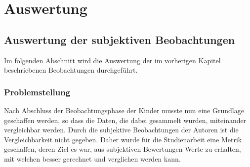 \chapter{Auswertung}
\section{Auswertung der subjektiven Beobachtungen}
Im folgenden Abschnitt wird die Auswertung der im vorherigen Kapitel beschriebenen Beobachtungen durchgeführt.
\subsection{Problemstellung}
Nach Abschluss der Beobachtungsphase der Kinder musste nun eine Grundlage geschaffen werden, so dass die Daten, die dabei gesammelt wurden, miteinander vergleichbar werden. Durch die subjektive Beobachtungen der Autoren ist die Vergleichbarkeit nicht gegeben. Daher wurde für die Studienarbeit eine Metrik geschaffen, deren Ziel es war, aus subjektiven Bewertungen Werte zu erhalten, mit welchen besser gerechnet und verglichen werden kann.
